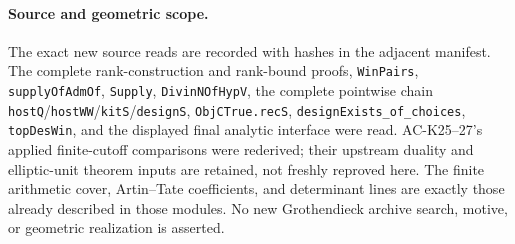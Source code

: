 \paragraph{Source and geometric scope.}
The exact new source reads are recorded with hashes in the
adjacent manifest.  The complete rank-construction and rank-bound
proofs, \texttt{WinPairs}, \texttt{supplyOfAdmOf}, \texttt{Supply},
\texttt{DivinNOfHypV}, the complete pointwise chain
\texttt{hostQ}/\texttt{hostWW}/\texttt{kitS}/\texttt{designS},
\texttt{ObjCTrue.recS}, \texttt{designExists\_of\_choices},
\texttt{topDesWin}, and the displayed final analytic interface
were read.  AC-K25--27's applied finite-cutoff comparisons were
rederived; their upstream duality and elliptic-unit theorem
inputs are retained, not freshly reproved here.
The finite arithmetic cover, Artin--Tate coefficients, and
determinant lines are exactly those already described in those
modules.  No new Grothendieck archive search, motive, or
geometric realization is asserted.
